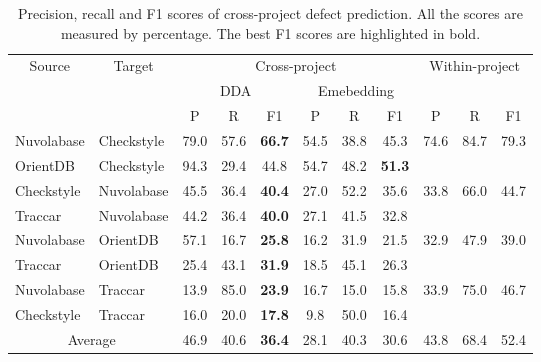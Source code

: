 \begin{table}[htbp]
	\centering
	\caption{Precision, recall and F1 scores of cross-project defect prediction. All the scores are measured by percentage. The best F1 scores are highlighted in bold.}
	\begin{adjustbox}{width=0.5\textwidth}
	\begin{tabular}{|c|c|c|c|c|c|c|c|c|c|c|}
		\hline
		\multirow{3}[6]{*}{Source } & \multirow{3}[6]{*}{Target} & \multicolumn{6}{c|}{Cross-project}            & \multicolumn{3}{c|}{\multirow{2}[4]{*}{Within-project}} \\
		\cline{3-8}          &       & \multicolumn{3}{c|}{DDA} & \multicolumn{3}{c|}{Emebedding} & \multicolumn{3}{c|}{} \\
		\cline{3-11}          &       & P     & R     & F1    & P     & R     & F1    & P     & R     & F1 \\
		\hline
		\hline
		\multicolumn{1}{|l|}{Nuvolabase} & \multicolumn{1}{l|}{Checkstyle} & 79.0  & 57.6  & \textbf{66.7}  & 54.5  & 38.8  & 45.3  & \multirow{2}[4]{*}{74.6} & \multirow{2}[4]{*}{84.7} & \multirow{2}[4]{*}{79.3} \\
		\cline{1-8}    \multicolumn{1}{|l|}{OrientDB} & \multicolumn{1}{l|}{Checkstyle} & 94.3  & 29.4  & 44.8  & 54.7  & 48.2  & \textbf{51.3} &       &       &  \\
		\hline
		\multicolumn{1}{|l|}{Checkstyle} & \multicolumn{1}{l|}{Nuvolabase} & 45.5  & 36.4  & \textbf{40.4}  & 27.0  & 52.2  & 35.6  & \multirow{2}[4]{*}{33.8} & \multirow{2}[4]{*}{66.0} & \multirow{2}[4]{*}{44.7} \\
		\cline{1-8}    \multicolumn{1}{|l|}{Traccar} & \multicolumn{1}{l|}{Nuvolabase} & 44.2  & 36.4  & \textbf{40.0}  & 27.1  & 41.5  & 32.8  &       &       &  \\
		\hline
		\multicolumn{1}{|l|}{Nuvolabase} & \multicolumn{1}{l|}{OrientDB} & 57.1  & 16.7  & \textbf{25.8}  & 16.2  & 31.9  & 21.5  & \multirow{2}[4]{*}{32.9} & \multirow{2}[4]{*}{47.9} & \multirow{2}[4]{*}{39.0} \\
		\cline{1-8}    \multicolumn{1}{|l|}{Traccar} & \multicolumn{1}{l|}{OrientDB} & 25.4  & 43.1  & \textbf{31.9}  & 18.5  & 45.1  & 26.3  &       &       &  \\
		\hline
		\multicolumn{1}{|l|}{Nuvolabase} & \multicolumn{1}{l|}{Traccar} & 13.9  & 85.0  & \textbf{23.9}  & 16.7  & 15.0  & 15.8  & \multirow{2}[4]{*}{33.9} & \multirow{2}[4]{*}{75.0} & \multirow{2}[4]{*}{46.7} \\
		\cline{1-8}    \multicolumn{1}{|l|}{Checkstyle} & \multicolumn{1}{l|}{Traccar} & 16.0  & 20.0  & \textbf{17.8}  & 9.8   & 50.0  & 16.4  &       &       &  \\
		\hline
		\hline
		\multicolumn{2}{|c|}{Average} & 46.9  & 40.6  & \textbf{36.4}  & 28.1  & 40.3  & 30.6  & 43.8  & 68.4  & 52.4 \\
		\hline
	\end{tabular}%
	\end{adjustbox}
	\label{tab:cross}%
\end{table}%

